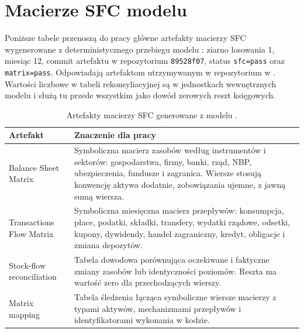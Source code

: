 \section{Macierze SFC modelu \amor{}}
\label{app:sfc-matrices}

Poniższe tabele przenoszą do pracy główne artefakty macierzy SFC wygenerowane z deterministycznego przebiegu modelu \amor{}: ziarno losowania 1, miesiąc 12, commit artefaktu w repozytorium \amor{} \texttt{89528f07}, status \texttt{sfc=pass} oraz \texttt{matrix=pass}. Odpowiadają artefaktom utrzymywanym w repozytorium w . Wartości liczbowe w tabeli rekonsyliacyjnej są w jednostkach wewnętrznych modelu i służą tu przede wszystkim jako dowód zerowych reszt księgowych.

\begin{table}[H]
\centering
\small
\begin{tabularx}{\textwidth}{p{}X}
\toprule
\textbf{Artefakt} & \textbf{Znaczenie dla pracy} \\
\midrule
Balance Sheet Matrix & Symboliczna macierz zasobów według instrumentów i sektorów: gospodarstwa, firmy, banki, rząd, NBP, ubezpieczenia, fundusze i zagranica. Wiersze stosują konwencję aktywa dodatnie, zobowiązania ujemne, z jawną sumą wiersza. \\
Transactions Flow Matrix & Symboliczna miesięczna macierz przepływów: konsumpcja, płace, podatki, składki, transfery, wydatki rządowe, odsetki, kupony, dywidendy, handel zagraniczny, kredyt, obligacje i zmiana depozytów. \\
Stock-flow reconciliation & Tabela dowodowa porównująca oczekiwane i faktyczne zmiany zasobów lub identyczności poziomów. Reszta ma wartość zero dla przechodzących wierszy. \\
Matrix mapping & Tabela śledzenia łącząca symboliczne wiersze macierzy z typami aktywów, mechanizmami przepływów i identyfikatorami wykonania w kodzie. \\
\bottomrule
\end{tabularx}
\caption{Artefakty macierzy SFC generowane z modelu \amor{}.}
\label{tab:sfc-artifacts}
\end{table}

